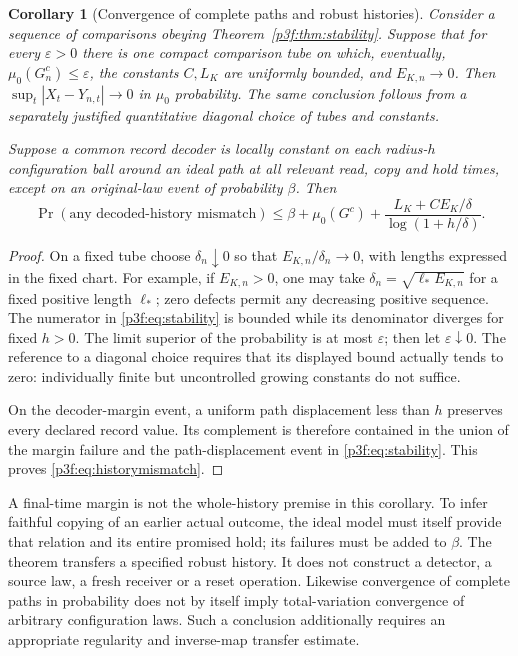\documentclass[11pt]{article}
\numberwithin{equation}{section}
\newtheorem{corollary}[theorem]{Corollary}
\theoremstyle{definition}
\theoremstyle{remark}
\begin{document}
\begin{corollary}[Convergence of complete paths and robust histories]
\label{p3f:cor:histories}
Consider a sequence of comparisons obeying
Theorem~\ref{p3f:thm:stability}. Suppose that for every
$\varepsilon>0$ there is one compact comparison tube on which,
eventually, $\mu_0(G_n^c)\leq\varepsilon$, the constants
$C,L_K$ are uniformly bounded, and $E_{K,n}\to0$.
Then $\sup_t|X_t-Y_{n,t}|\to0$ in $\mu_0$ probability.
The same conclusion follows from a separately justified
quantitative diagonal choice of tubes and constants.

Suppose a common record decoder is locally constant on each
radius-$h$ configuration ball around an ideal path at all
relevant read, copy and hold times, except on an original-law
event of probability $\beta$. Then
\begin{equation}\label{p3f:eq:historymismatch}
 \Pr(\text{any decoded-history mismatch})
 \leq\beta+\mu_0(G^c)+
             \frac{L_K+CE_K/\delta}{\log(1+h/\delta)}.
\end{equation}
\end{corollary}

\begin{proof}
On a fixed tube choose $\delta_n\downarrow0$ so that
$E_{K,n}/\delta_n\to0$, with lengths expressed in the fixed
chart. For example, if $E_{K,n}>0$, one may take
$\delta_n=\sqrt{\ell_*E_{K,n}}$ for a fixed positive length
$\ell_*$; zero defects permit any decreasing positive sequence.
The numerator in \eqref{p3f:eq:stability} is bounded while its
denominator diverges for fixed $h>0$. The limit superior of the
probability is at most $\varepsilon$; then let
$\varepsilon\downarrow0$. The reference to a diagonal choice
requires that its displayed bound actually tends to zero:
individually finite but uncontrolled growing constants do not
suffice.

On the decoder-margin event, a uniform path displacement less
than $h$ preserves every declared record value. Its complement
is therefore contained in the union of the margin failure and
the path-displacement event in \eqref{p3f:eq:stability}.
This proves \eqref{p3f:eq:historymismatch}.
\end{proof}

A final-time margin is not the whole-history premise in this
corollary. To infer faithful copying of an earlier actual outcome,
the ideal model must itself provide that relation and its entire
promised hold; its failures must be added to $\beta$. The theorem
transfers a specified robust history. It does not construct a
detector, a source law, a fresh receiver or a reset operation.
Likewise convergence of complete paths in probability does not
by itself imply total-variation convergence of arbitrary
configuration laws. Such a conclusion additionally requires
an appropriate regularity and inverse-map transfer estimate.
\end{document}
